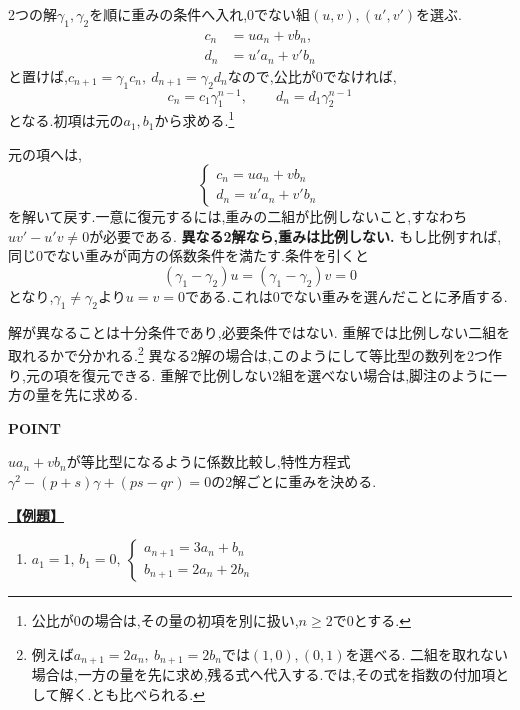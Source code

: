2つの解$\gamma_1,\gamma_2$を順に重みの条件へ入れ,0でない組$(u,v),(u',v')$を選ぶ.
\begin{align*}
  c_n&=u a_n+v b_n,\\
  d_n&=u'a_n+v'b_n
\end{align*}
と置けば,$c_{n+1}=\gamma_1c_n,\ d_{n+1}=\gamma_2d_n$なので,公比が0でなければ,
\[
  c_n=c_1\gamma_1^{n-1},\qquad
  d_n=d_1\gamma_2^{n-1}
\]
となる.初項は元の$a_1,b_1$から求める.\footnote{公比が0の場合は,その量の初項を別に扱い,$n\ge2$で0とする.}

元の項へは,
\[
  \begin{cases}
    c_n=u a_n+v b_n\\
    d_n=u'a_n+v'b_n
  \end{cases}
\]
を解いて戻す.一意に復元するには,重みの二組が比例しないこと,すなわち$uv'-u'v\ne0$が必要である.
\textbf{異なる2解なら,重みは比例しない.}
もし比例すれば,同じ0でない重みが両方の係数条件を満たす.条件を引くと
\[
  (\gamma_1-\gamma_2)u=(\gamma_1-\gamma_2)v=0
\]
となり,$\gamma_1\ne\gamma_2$より$u=v=0$である.これは0でない重みを選んだことに矛盾する.

解が異なることは十分条件であり,必要条件ではない.
重解では比例しない二組を取れるかで分かれる.\footnote{例えば$a_{n+1}=2a_n,\ b_{n+1}=2b_n$では$(1,0),(0,1)$を選べる.
  二組を取れない場合は,一方の量を先に求め,残る式へ代入する.では,その式を指数の付加項として解く.とも比べられる.}
異なる2解の場合は,このようにして等比型の数列を2つ作り,元の項を復元できる.
重解で比例しない2組を選べない場合は,脚注のように一方の量を先に求める.

\BookMathLayout{}{\pagebreak}
\begin{bookpoint}
  \textbf{POINT}\par
  $u a_n+v b_n$が等比型になるように係数比較し,特性方程式$\gamma^2-(p+s)\gamma+(ps-qr)=0$の2解ごとに重みを決める.
\end{bookpoint}

\noindent \hyperlink{book:example-system-1:hint:2}{\textbf{【例題】}}\par\nobreak
\begin{enumerate}[start=2,label=(\arabic*),parsep=3pt,format=\bookitemlink{example-system-1}{problem}{hint}]
  \item $a_1=1,\,b_1=0,\ \begin{cases}a_{n+1}=3a_n+b_n\\ b_{n+1}=2a_n+2b_n\end{cases}$
\end{enumerate}

